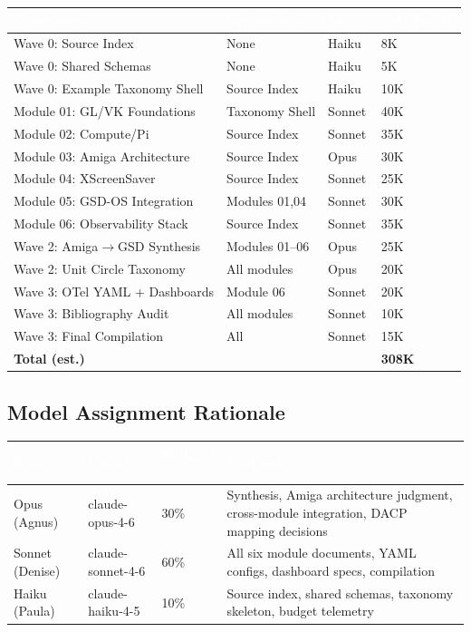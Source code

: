 \documentclass[11pt,letterpaper]{article}
\newcommand{\tableheader}[1]{\textbf{\sffamily\textcolor{white}{#1}}}
\begin{document}
\begin{center}
\begin{tabularx}{\textwidth}{L{3.5cm}L{3cm}C{2cm}C{2cm}}
\toprule
{}
\tableheader{Component} & \tableheader{Dependencies} & \tableheader{Model} & \tableheader{Est. Tokens} \\
\midrule
Wave 0: Source Index & None & Haiku & 8K \\
Wave 0: Shared Schemas & None & Haiku & 5K \\
Wave 0: Example Taxonomy Shell & Source Index & Haiku & 10K \\
Module 01: GL/VK Foundations & Taxonomy Shell & Sonnet & 40K \\
Module 02: Compute/Pi & Source Index & Sonnet & 35K \\
Module 03: Amiga Architecture & Source Index & Opus & 30K \\
Module 04: XScreenSaver & Source Index & Sonnet & 25K \\
Module 05: GSD-OS Integration & Modules 01,04 & Sonnet & 30K \\
Module 06: Observability Stack & Source Index & Sonnet & 35K \\
Wave 2: Amiga$\to$GSD Synthesis & Modules 01--06 & Opus & 25K \\
Wave 2: Unit Circle Taxonomy & All modules & Opus & 20K \\
Wave 3: OTel YAML + Dashboards & Module 06 & Sonnet & 20K \\
Wave 3: Bibliography Audit & All modules & Sonnet & 10K \\
Wave 3: Final Compilation & All & Sonnet & 15K \\
\textbf{Total (est.)} & & & \textbf{308K} \\
\bottomrule
\end{tabularx}
\end{center}

\subsection{Model Assignment Rationale}

\begin{center}
\begin{tabularx}{\textwidth}{L{2cm}C{2cm}C{1.5cm}X}
\toprule
{}
\tableheader{Role} & \tableheader{Model} & \tableheader{Budget \%} & \tableheader{Rationale} \\
\midrule
Opus (Agnus) & claude-opus-4-6 & 30\% & Synthesis, Amiga architecture judgment, cross-module integration, DACP mapping decisions \\
Sonnet (Denise) & claude-sonnet-4-6 & 60\% & All six module documents, YAML configs, dashboard specs, compilation \\
Haiku (Paula) & claude-haiku-4-5 & 10\% & Source index, shared schemas, taxonomy skeleton, budget telemetry \\
\bottomrule
\end{tabularx}
\end{center}
\end{document}
